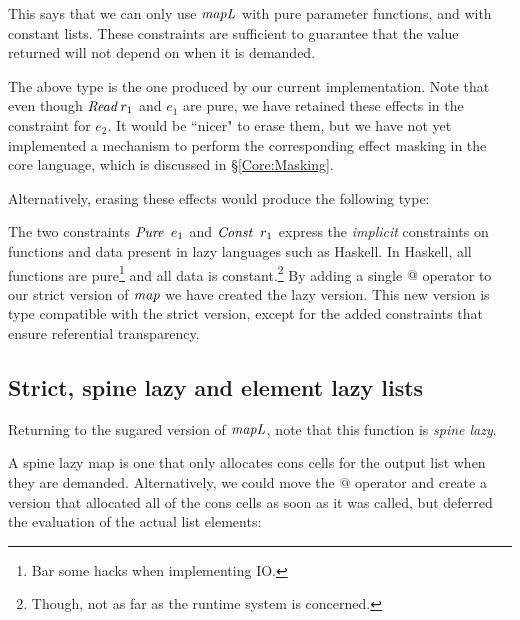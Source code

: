 This says that we can only use $\operatorname{\mathit{mapL}}$ with pure parameter functions, and with constant lists. These constraints are sufficient to guarantee that the value returned will not depend on when it is demanded.

The above type is the one produced by our current implementation. Note that even though $\operatorname{\mathit{Read}} r_1$ and $e_1$ are pure, we have retained these effects in the constraint for $e_2$. It would be ``nicer" to erase them, but we have not yet implemented a mechanism to perform the corresponding effect masking in the core language, which is discussed in \S\ref{Core:Masking}.

Alternatively, erasing these effects would produce the following type:


The two constraints $\operatorname{\mathit{Pure}} \ e_1$ and $\operatorname{\mathit{Const}} \ r_1$ express the \emph{implicit} constraints on functions and data present in lazy languages such as Haskell. In Haskell, all functions are pure\footnote{Bar some hacks when implementing IO.} and all data is constant.\footnote{Though, not as far as the runtime system is concerned.} By adding a single $@$ operator to our strict version of $\operatorname{\mathit{map}}$ we have created the lazy version. This new version is type compatible with the strict version, except for the added constraints that ensure referential transparency. 


\clearpage{}
\subsection{Strict, spine lazy and element lazy lists}
Returning to the sugared version of $\operatorname{\mathit{mapL}}$, note that this function is \emph{spine lazy}.


A spine lazy map is one that only allocates cons cells for the output list when they are demanded. Alternatively, we could move the $@$ operator and create a version that allocated all of the cons cells as soon as it was called, but deferred the evaluation of the actual list elements:


